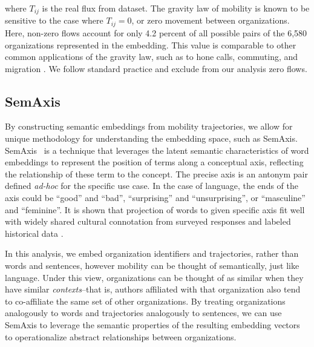 \documentclass[12pt]{article} %
\begin{document}
where $T_{ij}$ is the real flux from dataset. The gravity law of mobility is known to be sensitive to the case where $T_{ij} = 0$, or zero movement between organizations.
Here, non-zero flows account for only 4.2 percent of all possible pairs of  the 6,580 organizations represented in the embedding.
This value is comparable to other common applications of the gravity law, such as to hone calls, commuting, and migration \autocite{simini2012universal}.
We follow standard practice and exclude from our analysis zero flows.


%
%
\subsection*{SemAxis}
By constructing semantic embeddings from mobility trajectories, we allow for unique methodology for understanding the embedding space, such as SemAxis.
SemAxis~\autocite{an2018semaxis} is a technique that leverages the latent semantic characteristics of word embeddings to represent the position of terms along a conceptual axis, reflecting the relationship of these term to the concept.
The precise axis is an antonym pair defined \textit{ad-hoc} for the specific use case.
In the case of language, the ends of the axis could be ``good'' and ``bad'', ``surprising'' and ``unsurprising'', or ``masculine'' and ``feminine''. It is shown that projection of words to given specific axis fit well with widely shared cultural connotation from surveyed
responses and labeled historical data \autocite{kozlowski2018geometry}.

In this analysis, we embed organization identifiers and trajectories, rather than words and sentences, however mobility can be thought of semantically, just like language. 
Under this view, organizations can be thought of as similar when they have similar \textit{contexts}--that is, authors affiliated with that organization also tend to co-affiliate the same set of other organizations.
By treating organizations analogously to words and trajectories analogously to sentences, we can use SemAxis to leverage the semantic properties of the resulting embedding vectors to operationalize abstract relationships between organizations. 
\end{document}
